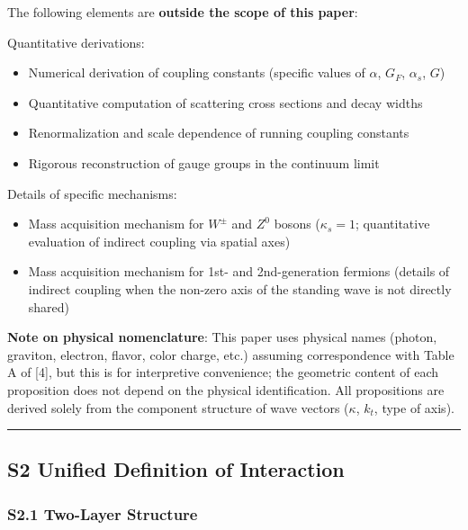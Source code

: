 \documentclass[
  a4paper,11pt]{article}
\providecommand{\tightlist}{%
  \setlength{\itemsep}{0pt}\setlength{\parskip}{0pt}}
\theoremstyle{definition}
\theoremstyle{remark}
\begin{document}
The following elements are \textbf{outside the scope of this paper}:

Quantitative derivations:

\begin{itemize}
\tightlist
\item
  Numerical derivation of coupling constants (specific values of
  \(\alpha\), \(G_F\), \(\alpha_s\), \(G\))
\item
  Quantitative computation of scattering cross sections and decay widths
\item
  Renormalization and scale dependence of running coupling constants
\item
  Rigorous reconstruction of gauge groups in the continuum limit
\end{itemize}

Details of specific mechanisms:

\begin{itemize}
\tightlist
\item
  Mass acquisition mechanism for \(W^{\pm}\) and \(Z^0\) bosons
  (\(\kappa_s = 1\); quantitative evaluation of indirect coupling via
  spatial axes)
\item
  Mass acquisition mechanism for 1st- and 2nd-generation fermions
  (details of indirect coupling when the non-zero axis of the standing
  wave is not directly shared)
\end{itemize}

\textbf{Note on physical nomenclature}: This paper uses physical names
(photon, graviton, electron, flavor, color charge, etc.) assuming
correspondence with Table A of {[}4{]}, but this is for interpretive
convenience; the geometric content of each proposition does not depend
on the physical identification. All propositions are derived solely from
the component structure of wave vectors (\(\kappa\), \(k_t\), type of
axis).

\begin{center}\rule{0.5\linewidth}{0.5pt}\end{center}

\subsection{S2 Unified Definition of
Interaction}\label{s2-unified-definition-of-interaction}

\subsubsection{S2.1 Two-Layer Structure}\label{s2.1-two-layer-structure}
\end{document}
